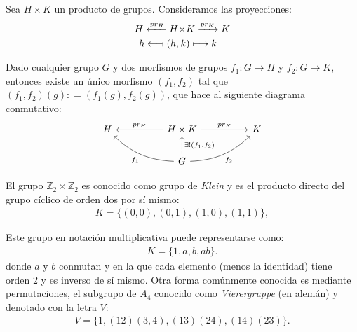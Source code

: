 \begin{theorem}
Sea $H\times K$ un producto de grupos. Consideramos las proyecciones:
\begin{align*}
H \xleftarrow[]{\text{$pr_H$}}  H \times & K  \xrightarrow[]{\text{$pr_K$}} K \\
h \longleftarrow\!\shortmid  (h,k&)  \longmapsto k
\end{align*}



Dado cualquier grupo $G$ y dos morfismos de grupos $f_1 \colon G \rightarrow H$ y $f_2 \colon G \rightarrow K$, entonces existe un único morfismo $(f_1,f_2)$ tal que $(f_1,f_2)(g)\colon=(f_1(g), f_2(g))$, que hace al siguiente diagrama conmutativo:
\[
\begin{tikzcd}
 H  && H \times K \arrow[ll,']{}{pr_H} \arrow[rr]{}{pr_K} && K\\
&& G \arrow[ull,bend left=20]{}{f_1} \arrow[u,dashrightarrow,']{}{\exists !(f_1,f_2)} \arrow[rru,bend right=20,']{}{f_2} &&
\end{tikzcd}
\]

\iffalse
\textcolor{red}{mira}
\[
\begin{tikzcd}
		&& G \arrow[dl l, ',bend right=20]{} {f_1} \arrow[d,dashrightarrow] {}{\exists !(f_1,f_2)}\arrow[drr,bend left=20]{}{f_2}&&\\
	H  & & H\times K \arrow[ll]{}{p_1}  \arrow[rr, ']{}{p_2} & &K   
\end{tikzcd}\qquad
(f_1,f_2)(g):= (f_1(g),f_2(g)).
\]
\fi
\end{theorem}







\begin{Ejemplo} \label{Klein}
El grupo $\mathbb{Z}_2\times \mathbb{Z}_2$ es conocido como grupo de \textit{Klein} y es el producto directo del grupo cíclico de orden dos por sí mismo:
\begin{align*}
    K = \{ (0,0), (0,1), (1,0), (1,1) \},
\end{align*}

Este grupo en notación multiplicativa puede representarse como:
\begin{align*}
    K = \{1, a,b, ab\} .
\end{align*}
donde $a$ y $b$ conmutan y en la que cada elemento (menos la identidad) tiene orden $2$ y es inverso de sí mismo. 
Otra forma comúnmente conocida es mediante permutaciones, el subgrupo de $A_4$ conocido como \textit{Vierergruppe} (en alemán) y denotado con la letra $V$:
\begin{align*}
    V = \{ 1, (12)(3,4), (13)(24), (14)(23) \}.
\end{align*}

\end{Ejemplo}



